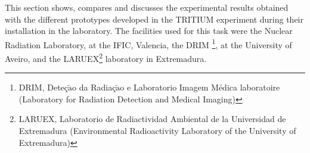 This section shows, compares and discusses the experimental results obtained with the different prototypes developed in the TRITIUM experiment during their installation in the laboratory. The facilities used for this task were the Nuclear Radiation Laboratory, at the IFIC, Valencia, the DRIM \footnote{DRIM, Deteç$\tilde{\text{a}}$o da Radiaç$\tilde{\text{a}}$o e Laboratorio Imagem Médica laboratoire (Laboratory for Radiation Detection and Medical Imaging)}, at the University of Aveiro, and the LARUEX\footnote{LARUEX, Laboratorio de Radiactividad Ambiental de la Universidad de Extremadura (Environmental Radioactivity Laboratory of the University of Extremadura)} laboratory in Extremadura.